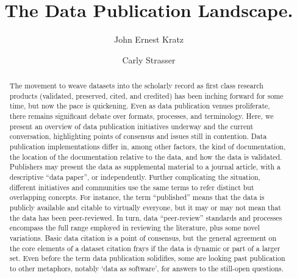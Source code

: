 \documentclass[10pt,twocolumn]{article}
\begin{document}
\title{The Data Publication Landscape.}
\author[1]{John Ernest Kratz}
\author[1]{Carly Strasser}

\maketitle
\thispagestyle{fancy}


\begin{abstract}


The movement to weave datasets into the scholarly record as first class research products (validated, preserved, cited, and credited) has been inching forward for some time, but now the pace is quickening.
Even as data publication venues proliferate, there remains significant debate over formats, processes, and terminology.
Here, we present an overview of data publication initiatives underway and the current conversation, highlighting points of consensus and issues still in contention.
Data publication implementations differ in, among other factors, the kind of documentation, the location of the documentation relative to the data, and how the data is validated.
Publishers may present the data as supplemental material to a journal article, with a descriptive ``data paper'', or independently.
Further complicating the situation, different initiatives and communities use the same terms to refer distinct but overlapping concepts.
For instance, the term ``published'' means that the data is publicly available and citable to virtually everyone, but it may or may not mean that the data has been peer-reviewed.
In turn, data ``peer-review'' standards and processes encompass the full range employed in reviewing the literature, plus some novel variations.
Basic data citation is a point of consensus, but the general agreement on the core elements of a dataset citation frays if the data is dynamic or part of a larger set.
Even before the term data publication solidifies, some are looking past publication to other metaphors, notably `data as software', for answers to the still-open questions.

\end{abstract}
\clearpage
\end{document}
